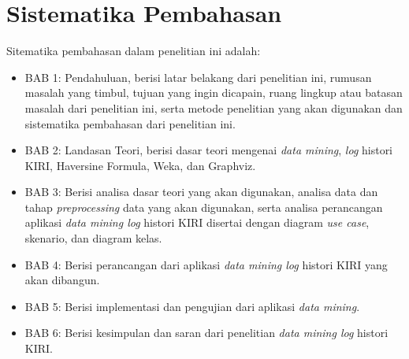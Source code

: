 \section{Sistematika Pembahasan}
Sitematika pembahasan dalam penelitian ini adalah:
\begin{itemize}
	\item BAB 1: Pendahuluan, berisi latar belakang dari penelitian ini, rumusan masalah yang timbul, tujuan yang ingin dicapain, ruang lingkup atau batasan masalah dari penelitian ini, serta metode penelitian yang akan digunakan dan sistematika pembahasan dari penelitian ini.
	\item BAB 2: Landasan Teori, berisi dasar teori mengenai \textsl{data mining}, \textsl{log} histori KIRI, Haversine Formula, Weka, dan Graphviz.
	\item BAB 3: Berisi analisa dasar teori yang akan digunakan, analisa data dan tahap \textsl{preprocessing} data yang akan digunakan, serta analisa perancangan aplikasi \textsl{data mining log} histori KIRI disertai dengan diagram \textsl{use case}, skenario, dan diagram kelas.
	\item BAB 4: Berisi perancangan dari aplikasi \textsl{data mining log} histori KIRI yang akan dibangun.
	\item BAB 5: Berisi implementasi dan pengujian dari aplikasi \textsl{data mining}.
	\item BAB 6: Berisi kesimpulan dan saran dari penelitian \textsl{data mining log} histori KIRI.
\end{itemize}